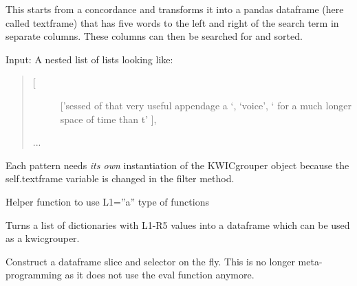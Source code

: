 \documentclass[letterpaper,10pt,english]{sphinxmanual}
\begin{document}
\begin{fulllineitems}
\label{apidoc:kwicgrouper.KWICgrouper}
This starts from a concordance and transforms it into a pandas dataframe
(here called textframe) that has five words to the left and right of the
search term in separate columns. These columns can then be searched for
and sorted.

Input:
A nested list of lists looking like:
\begin{quote}
\begin{description}
\item[{{[}}] \leavevmode
{[}'sessed of that very useful appendage  a `,
`voice',
`  for a much longer space of time than t'
{]},

\end{description}

...
\end{quote}

Each pattern needs \emph{its own} instantiation of the KWICgrouper object
because the self.textframe variable is changed in the filter method.

\begin{fulllineitems}
\label{apidoc:kwicgrouper.KWICgrouper.args_to_dict}
Helper function to use
L1=''a'' type of functions

\end{fulllineitems}


\begin{fulllineitems}
\label{apidoc:kwicgrouper.KWICgrouper.conc_to_df}
Turns a list of dictionaries with L1-R5 values into a dataframe
which can be used as a kwicgrouper.

\end{fulllineitems}


\begin{fulllineitems}
\label{apidoc:kwicgrouper.KWICgrouper.filter_textframe}
Construct a dataframe slice and selector on the fly.
This is no longer meta-programming as it does not use the eval
function anymore.


\end{fulllineitems}
\end{fulllineitems}
\end{document}
